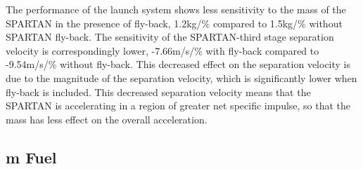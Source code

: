 The performance of the launch system shows less sensitivity to the mass of the SPARTAN in the presence of fly-back, 1.2kg/\% compared to 1.5kg/\% without SPARTAN fly-back. 
The sensitivity of the SPARTAN-third stage separation velocity is correspondingly lower, -7.66m/s/\% with fly-back compared to -9.54m/s/\% without fly-back. This decreased effect on the separation velocity is due to the magnitude of the separation velocity, which is significantly lower when fly-back is included. This decreased separation velocity means that the SPARTAN is accelerating in a region of greater net specific impulse, so that the mass has less effect on the overall acceleration. 



\subsection{m Fuel}

